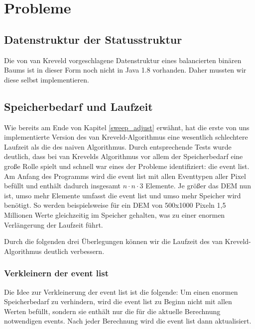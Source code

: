 \section{Probleme}

\subsection{Datenstruktur der Statusstruktur}
\label{tree}
Die von van Kreveld vorgeschlagene Datenstruktur eines balancierten binären Baums ist in dieser Form noch nicht in Java 1.8 vorhanden. Daher mussten 
wir diese selbst implementieren. 

\subsection{Speicherbedarf und Laufzeit}
\label{speicher}

Wie bereits am Ende von Kapitel \ref{sweep_adjust} erwähnt, hat die erste von uns implementierte Version des van Kreveld-Algorithmus eine 
wesentlich schlechtere Laufzeit als die des naiven Algorithmus. Durch entsprechende Tests wurde deutlich, dass bei van Krevelds Algorithmus vor allem
der Speicherbedarf eine große Rolle spielt und schnell war eines der Probleme identifiziert: die event list. Am Anfang des Programms wird die event list 
mit allen Eventtypen aller Pixel befüllt und enthält dadurch insgesamt $n \cdot n \cdot 3$ Elemente. Je größer das DEM nun ist, umso mehr Elemente 
umfasst die event list und umso mehr Speicher wird benötigt. So werden beispielsweise für ein DEM von 500x1000 Pixeln 1,5 Millionen Werte 
gleichzeitig im Speicher gehalten, was zu einer enormen Verlängerung der Laufzeit führt. 

Durch die folgenden drei Überlegungen können wir die Laufzeit des van Kreveld-Algorithmus deutlich verbessern.

\subsubsection{Verkleinern der event list}
Die Idee zur Verkleinerung der event list ist die folgende: Um einen enormen Speicherbedarf zu verhindern, wird die event list zu Beginn nicht mit 
allen Werten befüllt, sondern sie enthält nur die für die aktuelle Berechnung notwendigen events. Nach jeder Berechnung wird die event list dann 
aktualisiert. 

